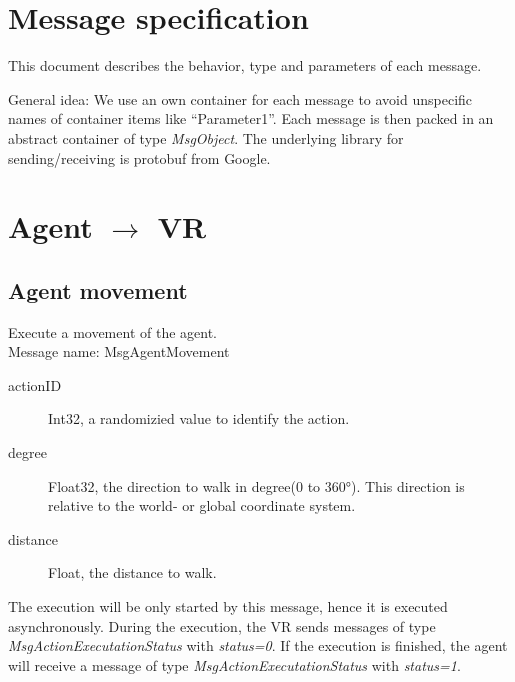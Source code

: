 \documentclass[a4paper,10pt]{scrartcl}
\begin{document}
\section*{Message specification}
This document describes the behavior, type and parameters of each message.

General idea: We use an own container for each message to avoid unspecific names of container items like ``Parameter1''. Each message is then packed in an abstract container of type \emph{MsgObject}. The underlying library for sending/receiving is protobuf from Google.


\tableofcontents

\section{Agent $\rightarrow$ VR}

\subsection{Agent movement}
Execute a movement of the agent. \\
Message name: MsgAgentMovement
\begin{description}
 \item [actionID] Int32, a randomizied value to identify the action.
 \item [degree] Float32, the direction to walk in degree(0 to 360°). This direction is relative to the world- or global coordinate system.
 \item [distance] Float, the distance to walk.
\end{description}
The execution will be only started by this message, hence it is executed asynchronously. During the execution, the VR sends messages of type \emph{MsgActionExecutationStatus} with \emph{status=0}. If the execution is finished, the agent will receive a message of type \emph{MsgActionExecutationStatus} with \emph{status=1}.
\end{document}

